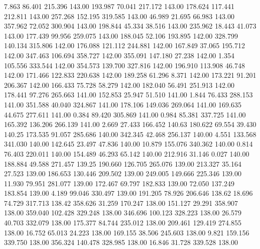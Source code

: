    7.863   86.401  215.396       143.00
 193.987   70.041  217.172       143.00
 178.624  117.441  212.811       143.00
 257.268  152.195  319.585       143.00
  46.989   21.695   66.983       143.00
 357.962   72.052  300.904       143.00
 198.844   45.334   38.516       143.00
 235.962   18.443   41.073       143.00
 177.439   99.956  259.075       143.00
 188.045   52.106  193.895       142.00
 328.799  140.134  315.806       142.00
 176.088  121.112  244.881       142.00
 167.849   37.065  195.712       142.00
 347.463  106.694  358.727       142.00
 355.091  147.180   27.238       142.00
   1.354  105.556  333.544       142.00
 354.573  139.700  327.816       142.00
 196.910  113.908   46.748       142.00
 171.466  122.833  220.638       142.00
 189.258   61.296    8.371       142.00
 173.221   91.201  206.367       142.00
 166.433   75.728   58.279       142.00
 182.040   56.491  251.913       142.00
 178.441   97.276  265.663       141.00
 152.853   25.947   51.510       141.00
   1.844   76.433  288.153       141.00
 351.588   40.040  324.867       141.00
 178.106  149.036  269.064       141.00
 169.635   44.675  277.611       141.00
   0.384   89.420  305.869       141.00
   0.984   85.381  337.725       141.00
 165.392  136.206  266.139       141.00
   2.669   27.433  166.452       140.63
 180.622   69.554   39.430       140.25
 173.535   91.057  285.686       140.00
 342.345   42.468  256.137       140.00
   4.551  133.568  341.030       140.00
 142.645   23.497   47.836       140.00
  10.879  155.076  340.362       140.00
   0.814   76.403  220.011       140.00
 154.489   46.293   65.142       140.00
 212.916   31.146    0.027       140.00
 188.884   49.588  271.457       139.25
 190.660  126.705  265.076       139.00
 213.327   35.164   27.523       139.00
 186.653  130.446  209.502       139.00
 249.005  149.666  225.346       139.00
  11.930   79.951  281.077       139.00
 172.467   69.797  182.833       139.00
  72.050  137.249  183.854       139.00
   4.189   99.046  330.497       139.00
 191.205   78.926  206.646       138.62
  18.696   74.729  317.713       138.42
 358.626   31.259  170.247       138.00
 151.127   29.291  358.907       138.00
 359.040  102.428  329.248       138.00
 346.696  100.123  328.223       138.00
  26.579   40.703  332.079       138.00
 175.377   84.744  235.012       138.00
 209.461  129.419  274.855       138.00
  16.752   65.013   24.223       138.00
 169.155   38.506  245.603       138.00
   9.821  159.156  339.750       138.00
 356.324  140.478  328.985       138.00
  16.846   31.728  339.528       138.00
